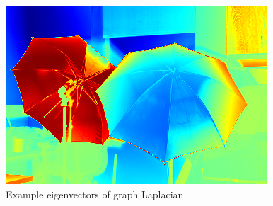 \documentclass{beamer}
\begin{document}
\begin{frame}
\begin{figure}[ht]
\begin{minipage}[b]{0.40\linewidth}
      \includegraphics[width=\textwidth]{./Images/Umbrella/evec3.png}
    \end{minipage}
    \caption{Example eigenvectors of graph Laplacian}
  \end{figure}
\end{frame}

\end{document}
